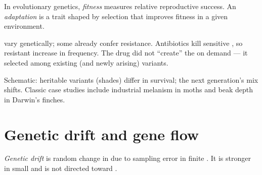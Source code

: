 \begin{definition}\label{def:g11:evolution-mechanisms:fitness}
In evolutionary genetics, \emph{fitness} measures relative
reproductive success. An \emph{adaptation} is a trait shaped by
selection that improves fitness in a given environment.
\end{definition}

\begin{example}\label{ex:g11:evolution-mechanisms:abx}
 vary genetically; some  already confer resistance. Antibiotics
kill sensitive , so resistant  increase in frequency. The drug did
not ``create'' the  on demand --- it selected among existing (and newly
arising) variants.
\end{example}

\begin{omfigure}

{\small Schematic: heritable variants (shades) differ in survival; the next
generation's mix shifts. Classic case studies include industrial melanism in
moths and beak depth in Darwin's finches.}
\end{omfigure}

\section{Genetic drift and gene flow}

\begin{definition}\label{def:g11:evolution-mechanisms:drift}
\emph{Genetic drift} is random change in 
due to sampling error in finite . It is stronger in small 
and is not directed toward .
\end{definition}

